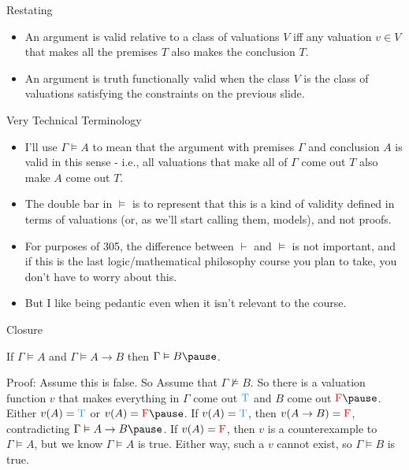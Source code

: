 \documentclass[
  ignorenonframetext,
]{beamer}
\providecommand{\tightlist}{%
  \setlength{\itemsep}{0pt}\setlength{\parskip}{0pt}}
\renewcommand{\,}{\text{, }}
\renewenvironment*{quote}	
	{\list{}{\rightmargin   \leftmargin} \item } 	
	{\endlist }
\def\True{\textcolor{dodgerblue}{\text{T}}}
\def\False{\textcolor{red}{\text{F}}}
\begin{document}
\begin{frame}{Restating}
\protect\hypertarget{restating}{}

\begin{itemize}[<+->]
\tightlist
\item
  An argument is valid relative to a class of valuations \(V\) iff any
  valuation \(v \in V\) that makes all the premises \(T\) also makes the
  conclusion \(T\).
\item
  An argument is truth functionally valid when the class \(V\) is the
  class of valuations satisfying the constraints on the previous slide.
\end{itemize}

\end{frame}

\begin{frame}{Very Technical Terminology}
\protect\hypertarget{very-technical-terminology}{}

\begin{itemize}
\tightlist
\item
  I'll use \(\Gamma \vDash A\) to mean that the argument with premises
  \(\Gamma\) and conclusion \(A\) is valid in this sense - i.e., all
  valuations that make all of \(\Gamma\) come out \(T\) also make \(A\)
  come out \(T\).
\item
  The double bar in \(\vDash\) is to represent that this is a kind of
  validity defined in terms of valuations (or, as we'll start calling
  them, models), and not proofs.
\item
  For purposes of 305, the difference between \(\vdash\) and \(\vDash\)
  is not important, and if this is the last logic/mathematical
  philosophy course you plan to take, you don't have to worry about
  this.
\item
  But I like being pedantic even when it isn't relevant to the course.
\end{itemize}

\end{frame}

\begin{frame}{Closure}
\protect\hypertarget{closure}{}

\begin{quote}
If \(\Gamma \vDash A\) and \(\Gamma \vDash A \rightarrow B\) then
\(\Gamma \vDash B \pause\).
\end{quote}

Proof: Assume this is false. So Assume that \(\Gamma \nvDash B\). So
there is a valuation function \(v\) that makes everything in \(\Gamma\)
come out \(\True\) and \(B\) come out \(\False \pause\). Either
\(v(A) = \True\) or \(v(A) = \False \pause\). If \(v(A) = \True\), then
\(v(A \rightarrow B) = \False\), contradicting
\(\Gamma \vDash A \rightarrow B \pause\). If \(v(A) = \False\), then
\(v\) is a counterexample to \(\Gamma \vDash A\), but we know
\(\Gamma \vDash A\) is true. Either way, such a \(v\) cannot exist, so
\(\Gamma \vDash B\) is true.

\end{frame}
\end{document}
